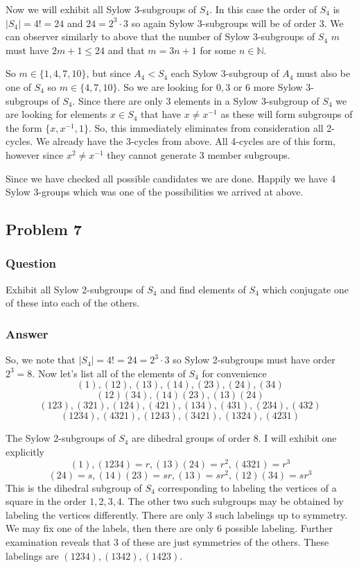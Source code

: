 \documentclass[12pt]{article}
\begin{document}
Now we will exhibit all Sylow 3-subgroups of $S_4$. In this case the order of $S_4$ is $|S_4|=4!=24$ and $24=2^3 \cdot 3$ so again Sylow 3-subgroups will be of order 3. We can observer similarly to above that the number of Sylow 3-subgroups of $S_4$ $m$ must have $2m+1 \leq 24$ and that $m=3n+1$ for some $n\in\mathbb{N}$.

So $m\in \{1,4,7,10\}$, but since $A_4 < S_4$ each Sylow 3-subgroup of $A_4$ must also be one of $S_4$ so  $m\in \{4,7,10\}$. So we are looking for $0,3$ or $6$ more Sylow 3-subgroups of $S_4$. Since there are only $3$ elements in a Sylow 3-subgroup of $S_4$ we are looking for elements $x\in S_4$ that have $x \neq x^{-1}$ as these will form subgroups of the form $\{x, x^{-1}, 1\}$. So, this immediately eliminates from consideration all 2-cycles. We already have the 3-cycles from above. All 4-cycles are of this form, however since $x^2 \neq x^{-1}$ they cannot generate 3 member subgroups.

Since we have checked all possible candidates we are done. Happily we have 4 Sylow 3-groups which was one of the possibilities we arrived at above.

\subsection{Problem 7}

\subsubsection{Question}

Exhibit all Sylow 2-subgroups of $S_4$ and find elements of $S_4$ which conjugate one of these into each of the others.


\subsubsection{Answer}


So, we note that $|S_4|=4!=24=2^3 \cdot 3$ so Sylow 2-subgroups must have order $2^3=8$. Now let's list all of the elements of $S_4$ for convenience
\[(1), (1 2), (1 3), (1 4), (2 3), (2 4), (3 4)\]
\[(1 2)(3 4), (1 4)(2 3),(1 3)(2 4)\]
\[(1 2 3), (3 2 1), (1 2 4), (4 2 1), (1 3 4), (4 3 1), (2 3 4), (4 3 2)\]
\[(1 2 3 4), (4 3 2 1), (1 2 4 3), (3 4 2 1), (1 3 2 4), (4 2 3 1)\]

The Sylow 2-subgroups of $S_4$ are dihedral groups of order 8. I will exhibit one explicitly
\[(1),(1 2 3 4)=r,(1 3)(2 4)=r^2, (4 3 2 1)=r^3\]
\[(2 4)=s,(1 4)(2 3)=sr,(13)=sr^2,(1 2)(3 4)=sr^3\]
This is the dihedral subgroup of $S_4$ corresponding to labeling the vertices of a square in the order $1, 2, 3, 4$. The other two such subgroups may be obtained by labeling the vertices differently. There are only 3 such labelings up to symmetry. We may fix one of the labels, then there are only 6 possible labeling. Further examination reveals that 3 of these are just symmetries of the others. These labelings are $(1 2 3 4), (1 3 4 2), (1 4 2 3)$.
\end{document}
